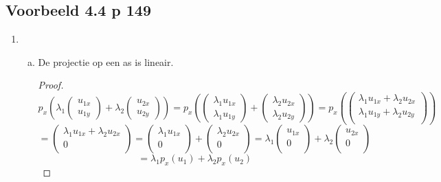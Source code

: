 \documentclass[lineaire_algebra_oplossingen.tex]{subfiles}
\begin{document}
\subsection{Voorbeeld 4.4 p 149}
\label{4.4}
\begin{enumerate}
\item
\begin{enumerate}[a)]
\item De projectie op een as is lineair.
\begin{proof}
\[
p_x \left(\lambda_1
\begin{pmatrix}
u_{1x}\\u_{1y}
\end{pmatrix} 
+ \lambda_2
\begin{pmatrix}
u_{2x}\\u_{2y}
\end{pmatrix} \right)
 = 
p_x \left(
\begin{pmatrix}
\lambda_1u_{1x}\\\lambda_1u_{1y}
\end{pmatrix} 
+ 
\begin{pmatrix}
\lambda_2u_{2x}\\\lambda_2u_{2y}
\end{pmatrix} \right)
=
p_x \left(
\begin{pmatrix}
\lambda_1u_{1x}+\lambda_2u_{2x}\\\lambda_1u_{1y}+\lambda_2u_{2y}\\
\end{pmatrix} \right)
\]
\[
= 
\begin{pmatrix}
\lambda_1u_{1x}+\lambda_2u_{2x}\\0\\
\end{pmatrix}
=
\begin{pmatrix}
\lambda_1u_{1x}\\0\\
\end{pmatrix}
+
\begin{pmatrix}
\lambda_2u_{2x}\\0\\
\end{pmatrix}
=
\lambda_1
\begin{pmatrix}
u_{1x}\\0\\
\end{pmatrix}
+
\lambda_2
\begin{pmatrix}
u_{2x}\\0\\
\end{pmatrix}
\]
\[
=
\lambda_1p_x(u_1) + \lambda_2p_x(u_2)
\]
\end{proof}


\end{enumerate}
\end{enumerate}
\end{document}
